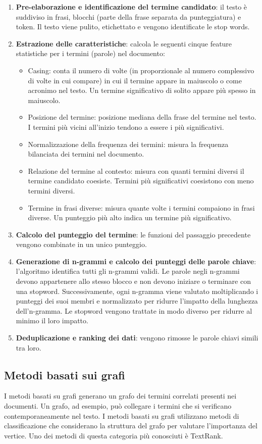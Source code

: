 \begin{enumerate}
\item \textbf{Pre-elaborazione e identificazione del termine candidato}: il testo è suddiviso in frasi, blocchi (parte della frase separata da punteggiatura) e token. Il testo viene pulito, etichettato e vengono identificate le stop words.
\item \textbf{Estrazione delle caratteristiche}: calcola le seguenti cinque feature statistiche per i termini (parole) nel documento:
\begin{itemize}
\item Casing: conta il numero di volte (in proporzionale al numero complessivo di volte in cui compare) in cui il termine appare in maiuscolo o come acronimo nel testo. Un termine significativo di solito appare più spesso in maiuscolo.
\item Posizione del termine: posizione mediana della frase del termine nel testo. I termini più vicini all'inizio tendono a essere i più significativi.
\item Normalizzazione della frequenza dei termini: misura la frequenza bilanciata dei termini nel documento.
\item Relazione del termine al contesto: misura con quanti termini diversi il termine candidato coesiste. Termini più significativi coesistono con meno termini diversi. 
\item Termine in frasi diverse: misura quante volte i termini compaiono in frasi diverse. Un punteggio più alto indica un termine più significativo.
\end{itemize}
\item \textbf{Calcolo del punteggio del termine}: le funzioni del passaggio precedente vengono combinate in un unico punteggio.
\item \textbf{Generazione di n-grammi e calcolo dei punteggi delle parole chiave}: l'algoritmo identifica tutti gli n-grammi validi. Le parole negli n-grammi devono appartenere allo stesso blocco e non devono iniziare o terminare con una stopword. Successivamente, ogni n-gramma viene valutato moltiplicando i punteggi dei suoi membri e normalizzato per ridurre l'impatto della lunghezza dell'n-gramma. Le stopword vengono trattate in modo diverso per ridurre al minimo il loro impatto.
\item \textbf{Deduplicazione e ranking dei dati}: vengono rimosse le parole chiavi simili tra loro.
\end{enumerate}

\subsection{Metodi basati sui grafi}
I metodi basati su grafi generano un grafo dei termini correlati presenti nei documenti. Un grafo, ad esempio, può collegare i termini che si verificano contemporaneamente nel testo. I metodi basati su grafi utilizzano metodi di classificazione che considerano la struttura del grafo per valutare l'importanza del vertice. Uno dei metodi di questa categoria più conosciuti è TextRank.

